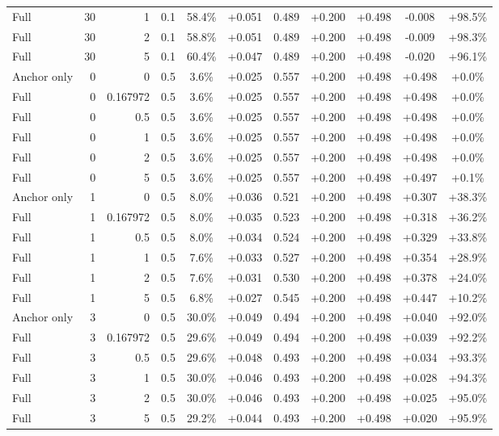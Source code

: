 \begin{table}[htbp]
\begin{tabular}{lrrrccccccc}
Full & 30 & 1 & 0.1 & 58.4\% & +0.051 & 0.489 & +0.200 & +0.498 & -0.008 & +98.5\% \\
Full & 30 & 2 & 0.1 & 58.8\% & +0.051 & 0.489 & +0.200 & +0.498 & -0.009 & +98.3\% \\
Full & 30 & 5 & 0.1 & 60.4\% & +0.047 & 0.489 & +0.200 & +0.498 & -0.020 & +96.1\% \\
Anchor only & 0 & 0 & 0.5 & 3.6\% & +0.025 & 0.557 & +0.200 & +0.498 & +0.498 & +0.0\% \\
Full & 0 & 0.167972 & 0.5 & 3.6\% & +0.025 & 0.557 & +0.200 & +0.498 & +0.498 & +0.0\% \\
Full & 0 & 0.5 & 0.5 & 3.6\% & +0.025 & 0.557 & +0.200 & +0.498 & +0.498 & +0.0\% \\
Full & 0 & 1 & 0.5 & 3.6\% & +0.025 & 0.557 & +0.200 & +0.498 & +0.498 & +0.0\% \\
Full & 0 & 2 & 0.5 & 3.6\% & +0.025 & 0.557 & +0.200 & +0.498 & +0.498 & +0.0\% \\
Full & 0 & 5 & 0.5 & 3.6\% & +0.025 & 0.557 & +0.200 & +0.498 & +0.497 & +0.1\% \\
Anchor only & 1 & 0 & 0.5 & 8.0\% & +0.036 & 0.521 & +0.200 & +0.498 & +0.307 & +38.3\% \\
Full & 1 & 0.167972 & 0.5 & 8.0\% & +0.035 & 0.523 & +0.200 & +0.498 & +0.318 & +36.2\% \\
Full & 1 & 0.5 & 0.5 & 8.0\% & +0.034 & 0.524 & +0.200 & +0.498 & +0.329 & +33.8\% \\
Full & 1 & 1 & 0.5 & 7.6\% & +0.033 & 0.527 & +0.200 & +0.498 & +0.354 & +28.9\% \\
Full & 1 & 2 & 0.5 & 7.6\% & +0.031 & 0.530 & +0.200 & +0.498 & +0.378 & +24.0\% \\
Full & 1 & 5 & 0.5 & 6.8\% & +0.027 & 0.545 & +0.200 & +0.498 & +0.447 & +10.2\% \\
Anchor only & 3 & 0 & 0.5 & 30.0\% & +0.049 & 0.494 & +0.200 & +0.498 & +0.040 & +92.0\% \\
Full & 3 & 0.167972 & 0.5 & 29.6\% & +0.049 & 0.494 & +0.200 & +0.498 & +0.039 & +92.2\% \\
Full & 3 & 0.5 & 0.5 & 29.6\% & +0.048 & 0.493 & +0.200 & +0.498 & +0.034 & +93.3\% \\
Full & 3 & 1 & 0.5 & 30.0\% & +0.046 & 0.493 & +0.200 & +0.498 & +0.028 & +94.3\% \\
Full & 3 & 2 & 0.5 & 30.0\% & +0.046 & 0.493 & +0.200 & +0.498 & +0.025 & +95.0\% \\
Full & 3 & 5 & 0.5 & 29.2\% & +0.044 & 0.493 & +0.200 & +0.498 & +0.020 & +95.9\% \\

\end{tabular}
\end{table}
